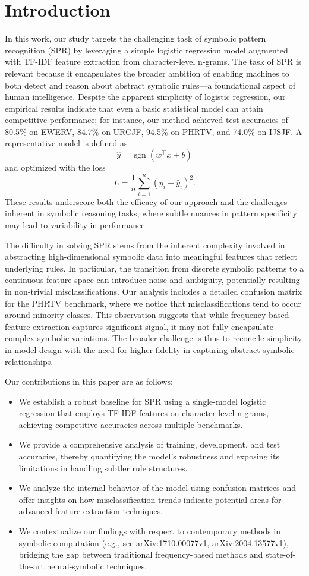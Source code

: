 \documentclass{article}
\begin{document}
\section{Introduction}
In this work, our study targets the challenging task of symbolic pattern recognition (SPR) by leveraging a simple logistic regression model augmented with TF-IDF feature extraction from character-level n-grams. The task of SPR is relevant because it encapsulates the broader ambition of enabling machines to both detect and reason about abstract symbolic rules—a foundational aspect of human intelligence. Despite the apparent simplicity of logistic regression, our empirical results indicate that even a basic statistical model can attain competitive performance; for instance, our method achieved test accuracies of 80.5\% on EWERV, 84.7\% on URCJF, 94.5\% on PHRTV, and 74.0\% on IJSJF. A representative model is defined as 
\[
\hat{y} = \operatorname{sgn}(w^\top x + b)
\]
and optimized with the loss 
\[
L = \frac{1}{n} \sum_{i=1}^{n}(y_i - \hat{y}_i)^2.
\]
These results underscore both the efficacy of our approach and the challenges inherent in symbolic reasoning tasks, where subtle nuances in pattern specificity may lead to variability in performance.

The difficulty in solving SPR stems from the inherent complexity involved in abstracting high-dimensional symbolic data into meaningful features that reflect underlying rules. In particular, the transition from discrete symbolic patterns to a continuous feature space can introduce noise and ambiguity, potentially resulting in non-trivial misclassifications. Our analysis includes a detailed confusion matrix for the PHRTV benchmark, where we notice that misclassifications tend to occur around minority classes. This observation suggests that while frequency-based feature extraction captures significant signal, it may not fully encapsulate complex symbolic variations. The broader challenge is thus to reconcile simplicity in model design with the need for higher fidelity in capturing abstract symbolic relationships.

Our contributions in this paper are as follows:
\begin{itemize}
    \item We establish a robust baseline for SPR using a single-model logistic regression that employs TF-IDF features on character-level n-grams, achieving competitive accuracies across multiple benchmarks.
    \item We provide a comprehensive analysis of training, development, and test accuracies, thereby quantifying the model's robustness and exposing its limitations in handling subtler rule structures.
    \item We analyze the internal behavior of the model using confusion matrices and offer insights on how misclassification trends indicate potential areas for advanced feature extraction techniques.
    \item We contextualize our findings with respect to contemporary methods in symbolic computation (e.g., see arXiv:1710.00077v1, arXiv:2004.13577v1), bridging the gap between traditional frequency-based methods and state-of-the-art neural-symbolic techniques.
\end{itemize}
\end{document}
